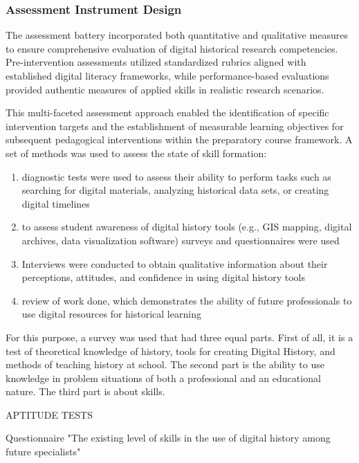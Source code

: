 \subsubsection{Assessment Instrument Design}

The assessment battery incorporated both quantitative and qualitative measures to ensure comprehensive evaluation of digital historical research competencies. Pre-intervention assessments utilized standardized rubrics aligned with established digital literacy frameworks, while performance-based evaluations provided authentic measures of applied skills in realistic research scenarios.

This multi-faceted assessment approach enabled the identification of specific intervention targets and the establishment of measurable learning objectives for subsequent pedagogical interventions within the preparatory course framework.
A set of methods was used to assess the state of skill formation:
\begin{enumerate}

    \item diagnostic tests were used to assess their ability to perform tasks such as searching for digital materials, analyzing historical data sets, or creating digital timelines
    
    \item to assess student awareness of digital history tools (e.g., GIS mapping, digital archives, data visualization software) surveys and questionnaires were used
    
    \item Interviews were conducted to obtain qualitative information about their perceptions, attitudes, and confidence in using digital history tools
    
    \item review of work done, which demonstrates the ability of future professionals to use digital resources for historical learning
\end{enumerate}

For this purpose, a survey was used that had three equal parts. First of all, it is a test of theoretical knowledge of history, tools for creating Digital History, and methods of teaching history at school. The second part is the ability to use knowledge in problem situations of both a professional and an educational nature.
The third part is about skills.

APTITUDE TESTS \cite{ary}

{Questionnaire "The existing level of skills in the use of digital history among future specialists"}


